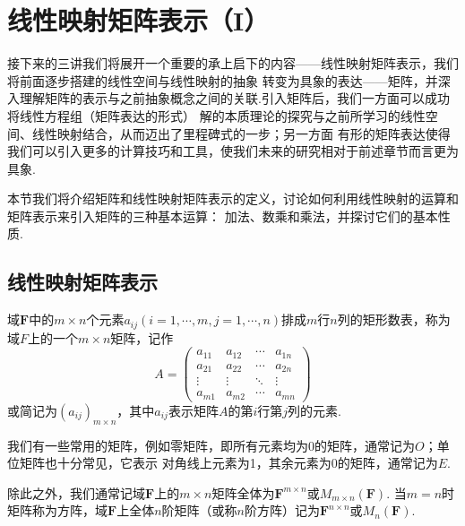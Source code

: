 \chapter{线性映射矩阵表示（I）}

接下来的三讲我们将展开一个重要的承上启下的内容——线性映射矩阵表示，我们将前面逐步搭建的线性空间与线性映射的抽象
转变为具象的表达——矩阵，并深入理解矩阵的表示与之前抽象概念之间的关联.引入矩阵后，我们一方面可以成功将线性方程组（矩阵表达的形式）
解的本质理论的探究与之前所学习的线性空间、线性映射结合，从而迈出了里程碑式的一步；另一方面
有形的矩阵表达使得我们可以引入更多的计算技巧和工具，使我们未来的研究相对于前述章节而言更为具象.

本节我们将介绍矩阵和线性映射矩阵表示的定义，讨论如何利用线性映射的运算和矩阵表示来引入矩阵的三种基本运算：
加法、数乘和乘法，并探讨它们的基本性质.

\section{线性映射矩阵表示}
\begin{definition}
    域$\mathbf{F}$中的$m\times n$个元素$a_{ij}(i=1,\cdots,m,j=1,\cdots,n)$排成$m$行$n$列的矩形数表，称为
    域$F$上的一个$m\times n$矩阵，记作
    \[A=\begin{pmatrix}
        a_{11} & a_{12} & \cdots & a_{1n} \\
        a_{21} & a_{22} & \cdots & a_{2n} \\
        \vdots & \vdots & \ddots & \vdots \\
        a_{m1} & a_{m2} & \cdots & a_{mn}
    \end{pmatrix}\]
    或简记为$(a_{ij})_{m\times n}$，其中$a_{ij}$表示矩阵$A$的第$i$行第$j$列的元素.
\end{definition}

我们有一些常用的矩阵，例如零矩阵，即所有元素均为0的矩阵，通常记为$O$；单位矩阵也十分常见，它表示
对角线上元素为1，其余元素为0的矩阵，通常记为$E$.

除此之外，我们通常记域$\mathbf{F}$上的$m\times n$矩阵全体为$\mathbf{F}^{m\times n}$或$M_{m\times n}(\mathbf{F})$.
当$m=n$时矩阵称为方阵，域$\mathbf{F}$上全体$n$阶矩阵（或称$n$阶方阵）记为$\mathbf{F}^{n\times n}$或$M_n(\mathbf{F})$.

